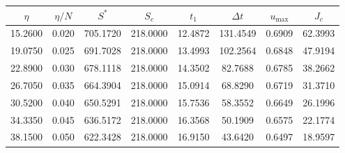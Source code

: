 \begin{tabular}{cccccccc}
\toprule
$\eta$ & $\eta/N$ & $S^*$ & $S_c$ & $t_1$ & $\Delta t$ & $u_{\max}$ & $J_c$ \\
\midrule
15.2600 & 0.020 & 705.1720 & 218.0000 & 12.4872 & 131.4549 & 0.6909 & 62.3993 \\
19.0750 & 0.025 & 691.7028 & 218.0000 & 13.4993 & 102.2564 & 0.6848 & 47.9194 \\
22.8900 & 0.030 & 678.1118 & 218.0000 & 14.3502 & 82.7688 & 0.6785 & 38.2662 \\
26.7050 & 0.035 & 664.3904 & 218.0000 & 15.0914 & 68.8290 & 0.6719 & 31.3710 \\
30.5200 & 0.040 & 650.5291 & 218.0000 & 15.7536 & 58.3552 & 0.6649 & 26.1996 \\
34.3350 & 0.045 & 636.5172 & 218.0000 & 16.3568 & 50.1909 & 0.6575 & 22.1774 \\
38.1500 & 0.050 & 622.3428 & 218.0000 & 16.9150 & 43.6420 & 0.6497 & 18.9597 \\
\bottomrule
\end{tabular}
